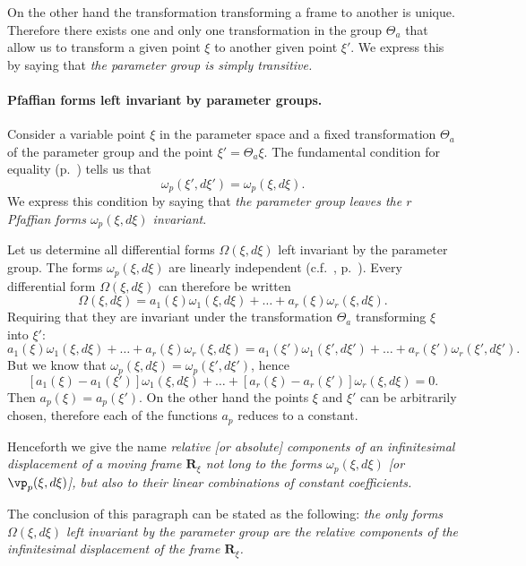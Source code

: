On the other hand the transformation transforming a frame to another is unique. Therefore there exists one and only one transformation in the group $\Theta_{a}$ that allow us to transform a given point $\xi$ to another given point $\xi'$. We express this by saying that \emph{the parameter group is simply transitive.}

\paragraph{Pfaffian forms left invariant by parameter groups.}
\label{sec:80}
Consider a variable point $\xi$ in the parameter space and a fixed transformation $\Theta_{a}$ of the parameter group and the point $\xi'=\Theta_{a}\xi$. The fundamental condition for equality (p.~\pageref{sec:76}) tells us that
\[
\omega_{p}(\xi',d\xi')=\omega_{p}(\xi,d\xi).
\]
We express this condition by saying that \emph{the parameter group leaves the $r$ Pfaffian forms $\omega_{p}(\xi,d\xi)$ invariant}.

Let us determine all differential forms $\Omega(\xi,d\xi)$ left invariant by the parameter group. The forms $\omega_{p}(\xi,d\xi)$ are linearly independent (c.f.~, p.~\pageref{sec:80}). Every differential form $\Omega(\xi,d\xi)$ can therefore be written
\[
\Omega(\xi,d\xi)=a_{1}(\xi)\omega_{1}(\xi,d\xi)+\dots+a_{r}(\xi)\omega_{r}(\xi,d\xi).
\]
Requiring that they are invariant under the transformation $\Theta_{a}$ transforming $\xi$ into $\xi'$:
\[
a_{1}(\xi)\omega_{1}(\xi,d\xi)+\dots+a_{r}(\xi)\omega_{r}(\xi,d\xi)=a_{1}(\xi')\omega_{1}(\xi',d\xi')+\dots+a_{r}(\xi')\omega_{r}(\xi',d\xi').
\]
But we know that $\omega_{p}(\xi,d\xi)=\omega_{p}(\xi',d\xi')$, hence
\[
[a_{1}(\xi)-a_{1}(\xi')]\omega_{1}(\xi,d\xi)+\dots+[a_{r}(\xi)-a_{r}(\xi')]\omega_{r}(\xi,d\xi)=0.
\]
Then $a_{p}(\xi)=a_{p}(\xi')$. On the other hand the points $\xi$ and $\xi'$ can be arbitrarily chosen, therefore each of the functions $a_{p}$ reduces to a constant.

Henceforth we give the name \emph{relative [or absolute] components of an infinitesimal displacement of a moving frame $\mathbf{R}_{\xi}$ not long to the forms $\omega_{p}(\xi,d\xi)$ [or $\vp_{p}(\xi,d\xi)$], but also to their linear combinations of constant coefficients.}

The conclusion of this paragraph can be stated as the following: \emph{the only forms $\Omega(\xi,d\xi)$ left invariant by the parameter group are the relative components of the infinitesimal displacement of the frame $\mathbf{R}_{\xi}$.}


